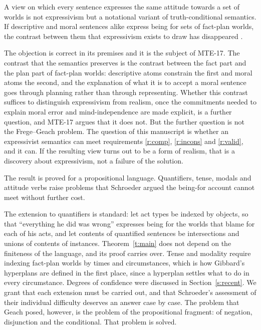 \documentclass{situationist-preprint}
\begin{document}
\begin{objection}
A view on which every sentence expresses the same attitude towards a set of worlds is not expressivism but a notational variant of truth-conditional semantics. If descriptive and moral sentences alike express being for sets of fact-plan worlds, the contrast between them that expressivism exists to draw has disappeared \citep{Dreier2004}.
\end{objection}

\begin{reply}
The objection is correct in its premises and it is the subject of MTE-17. The contrast that the semantics preserves is the contrast between the fact part and the plan part of fact-plan worlds: descriptive atoms constrain the first and moral atoms the second, and the explanation of what it is to accept a moral sentence goes through planning rather than through representing. Whether this contrast suffices to distinguish expressivism from realism, once the commitments needed to explain moral error and mind-independence are made explicit, is a further question, and MTE-17 argues that it does not. But the further question is not the Frege--Geach problem. The question of this manuscript is whether an expressivist semantics can meet requirements \ref{r:comp}, \ref{r:incons} and \ref{r:valid}, and it can. If the resulting view turns out to be a form of realism, that is a discovery about expressivism, not a failure of the solution.
\end{reply}

\begin{objection}
The result is proved for a propositional language. Quantifiers, tense, modals and attitude verbs raise problems that Schroeder argued the being-for account cannot meet without further cost.
\end{objection}

\begin{reply}
The extension to quantifiers is standard: let act types be indexed by objects, so that \enquote{everything he did was wrong} expresses being for the worlds that blame for each of his acts, and let contents of quantified sentences be intersections and unions of contents of instances. Theorem~\ref{t:main} does not depend on the finiteness of the language, and its proof carries over. Tense and modality require indexing fact-plan worlds by times and circumstances, which is how Gibbard's hyperplans are defined in the first place, since a hyperplan settles what to do in every circumstance. Degrees of confidence were discussed in Section~\ref{s:recent}. We grant that each extension must be carried out, and that Schroeder's assessment of their individual difficulty deserves an answer case by case. The problem that Geach posed, however, is the problem of the propositional fragment: of negation, disjunction and the conditional. That problem is solved.
\end{reply}
\end{document}
